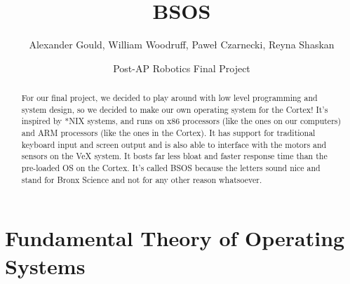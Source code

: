\documentclass[english]{article}
\begin{document}
\title{BSOS}


\author{Alexander Gould, William Woodruff, Pawe\l{} Czarnecki, Reyna Shaskan}


\date{Post-AP Robotics Final Project}
\maketitle
\begin{abstract}
For our final project, we decided to play around with low level programming
and system design, so we decided to make our own operating system
for the Cortex! It's inspired by {*}NIX systems, and runs on x86 processors
(like the ones on our computers) and ARM processors (like the ones
in the Cortex). It has support for traditional keyboard input and
screen output and is also able to interface with the motors and sensors
on the VeX system. It bosts far less bloat and faster response time
than the pre-loaded OS on the Cortex. It's called BSOS because the
letters sound nice and stand for Bronx Science and not for any other reason whatsoever.
\end{abstract}

\part{Fundamental Theory of Operating Systems}
\end{document}
